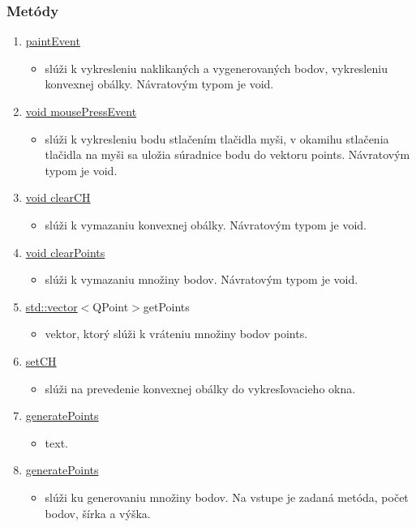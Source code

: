 \documentclass[12pt]{article}
\begin{document}
\subsubsection{Metódy}
\begin{enumerate}
\item[] \underline{paintEvent}
\begin{itemize}
\item slúži k vykresleniu naklikaných a vygenerovaných bodov, vykresleniu konvexnej obálky. Návratovým typom je void.
\end{itemize}
\item[] \underline{void mousePressEvent}
\begin{itemize}
\item slúži k vykresleniu bodu  stlačením tlačidla myši, v okamihu stlačenia tlačidla na myši sa uložia súradnice bodu do vektoru points. Návratovým typom je void.
\end{itemize}
\item[] \underline{void clearCH}
\begin{itemize}
\item slúži k vymazaniu konvexnej obálky. Návratovým typom je void.
\end{itemize}
\item[] \underline{void clearPoints}
\begin{itemize}
\item slúži k vymazaniu množiny bodov. Návratovým typom je void.
\end{itemize}
\item[] \underline {std::vector}$<${QPoint}$>${getPoints}
\begin{itemize}
\item vektor, ktorý slúži k vráteniu množiny bodov points.
\end{itemize}
\item[] \underline {setCH}
\begin{itemize}
\item slúži na prevedenie konvexnej obálky do vykresľovacieho okna.
\end{itemize}
\item[] \underline {generatePoints}
\begin{itemize}
\item text.
\end{itemize}
\item[] \underline {generatePoints}
\begin{itemize}
\item slúži ku generovaniu množiny bodov. Na vstupe je zadaná metóda, počet bodov, šírka a výška.

\end{itemize}
\end{enumerate}
\end{document}

